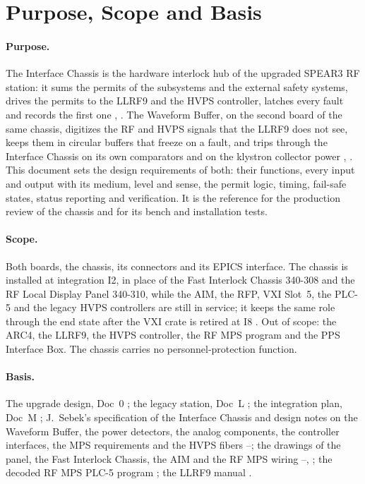 \section{Purpose, Scope and Basis}\label{sec:purpose}

\paragraph{Purpose.} The Interface Chassis is the hardware interlock hub of the
upgraded SPEAR3 RF station: it sums the permits of the subsystems and the external
safety systems, drives the permits to the LLRF9 and the HVPS controller, latches every
fault and records the first one , . The Waveform Buffer, on the second board of the same chassis,
digitizes the RF and HVPS signals that the LLRF9 does not see, keeps them in circular
buffers that freeze on a fault, and trips through the Interface Chassis on its own
comparators and on the klystron collector power , . This document sets the
design requirements of both: their functions, every input and output with its medium,
level and sense, the permit logic, timing, fail-safe states, status reporting and
verification. It is the reference for the production review of the chassis and for its bench and installation tests.

\paragraph{Scope.} Both boards, the chassis, its connectors and its EPICS interface.
The chassis is installed at integration I2, in place of the Fast Interlock
Chassis 340-308 and the RF Local Display Panel 340-310, while the AIM, the RFP, VXI
Slot~5, the PLC-5 and the legacy HVPS controllers are still in service; it keeps the same role
through the end state after the VXI crate is retired at I8 . Out of scope: the
ARC4, the LLRF9, the HVPS controller, the RF MPS program and the PPS Interface Box.
The chassis carries no personnel-protection function.

\paragraph{Basis.} The upgrade design, Doc~0 ; the legacy station, Doc~L ;
the integration plan, Doc~M ; J.~Sebek's specification of the Interface Chassis
and design notes on the Waveform Buffer, the power detectors, the analog components,
the controller interfaces, the MPS requirements and the HVPS fibers
--; the drawings of the panel, the Fast Interlock Chassis, the AIM and the
RF MPS wiring --, ; the decoded RF MPS PLC-5 program ; the
LLRF9 manual .

